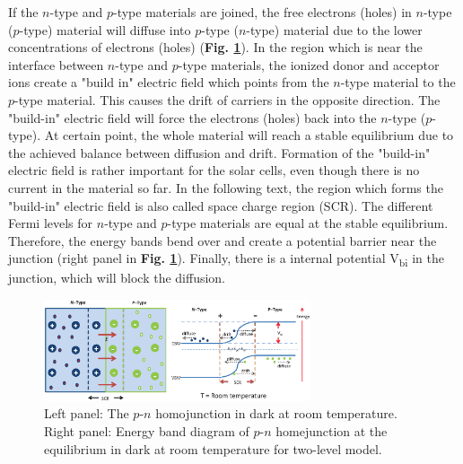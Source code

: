 \documentclass[a4paper, 12pt, titlepage,oneside,drop]{kthesis}
\begin{document}
If the $n$-type and $p$-type materials are joined, the free electrons (holes) in $n$-type ($p$-type) material will diffuse into $p$-type ($n$-type) material due to the
lower concentrations of electrons (holes) (\textbf{Fig. \ref{pnjunction}}). In the region which is near the interface between $n$-type and $p$-type materials, the ionized donor and acceptor ions create a
"build in" electric field which points from the $n$-type material to the $p$-type material. This causes the drift of carriers in the opposite direction. The "build-in" electric field will force the electrons (holes) back into
the $n$-type ($p$-type). At certain point, 
the whole material will reach a stable equilibrium due to the achieved balance between diffusion and drift. Formation of the "build-in" electric field is rather important for the solar cells, even though there is no current in 
the material so far. In the following text, the region which forms the "build-in" electric field is also called space charge region (SCR). The different Fermi levels for $n$-type and $p$-type materials are
equal at the stable equilibrium. Therefore, the energy bands bend over and create a potential barrier near the junction (right panel in \textbf{Fig. \ref{pnjunction}}). Finally, there is a internal potential V\textsubscript{bi}
in the junction, which will block the diffusion.

\begin{figure}[H]
    \begin{center}
            \includegraphics[width=0.7\textwidth]{pnjunction.eps}
     \end{center}
    \caption{Left panel: The $p$-$n$ homojunction in dark at room temperature. Right panel: Energy band diagram of $p$-$n$ homejunction at the equilibrium in dark at room temperature for two-level model. }      
    \label{pnjunction}
\end{figure}
\end{document}
